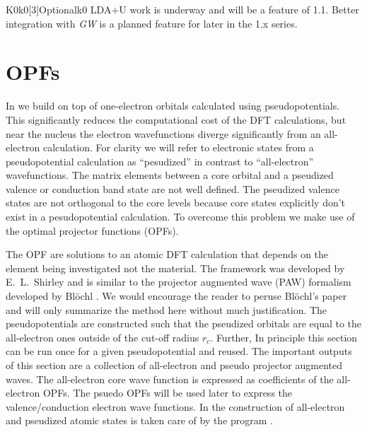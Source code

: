 \documentclass[11pt]{report}
\begin{document}
\begin{Card}{K0}{k0[3]}{Optional}{k0}
LDA+U work is underway and will be a feature of  1.1. Better integration with {\it GW} is a planned feature for later in the 1.x series. 


\chapter{OPFs}
\label{opf}

In  we build on top of one-electron orbitals calculated using pseudopotentials. 
This significantly reduces the computational cost of the DFT calculations, but near the nucleus the electron wavefunctions diverge significantly from an all-electron calculation. 
For clarity we will refer to electronic states from a pseudopotential calculation as ``pesudized'' in contrast to ``all-electron'' wavefunctions. 
The matrix elements between a core orbital and a pseudized valence or conduction band state are not well defined. 
The pseudized valence states are not orthogonal to the core levels because core states explicitly don't exist in a pesudopotential calculation.
To overcome this problem we make use of the optimal projector functions (OPFs). 

The OPF are solutions to an atomic DFT calculation that depends on the element being investigated not the material. 
The framework was developed by E.\ L.\ Shirley \cite{ShirleyOPF} and is similar to the projector augmented wave (PAW) formalism developed by Bl\"{o}chl \cite{PhysRevB.50.17953}. 
%
We would encourage the reader to peruse Bl\"{o}chl's paper and will only summarize the method here without much justification.
The pseudopotentials are constructed such that the pseudized orbitals are equal to the all-electron ones outside of the cut-off radius $r_c$. 
Further,  
In principle this section can be run once for a given pseudopotential and reused. 
The important outputs of this section are a collection of all-electron and pseudo projector augmented waves. 
The all-electron core wave function is expressed as coefficients of the all-electron OPFs. 
The psuedo OPFs will be used later to express the valence/conduction electron wave functions.
%
In  
the construction of all-electron and pseudized atomic states is taken care of by the program . 


\end{Card}
\end{document}
